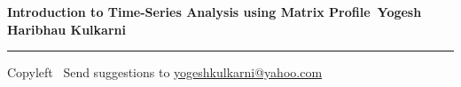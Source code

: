 
\graphicspath{{images/}}

\footnotesize


\begin{center}
\Large{\textbf{Introduction to Time-Series Analysis using Matrix Profile\ Yogesh Haribhau Kulkarni}}  
\end{center}

\begin{multicols}{2}

\end{multicols}

\rule{\linewidth}{0.25pt}
\scriptsize
Copyleft \textcopyleft\  Send suggestions to 
\href{http://www.yogeshkulkarni.com}{yogeshkulkarni@yahoo.com}


